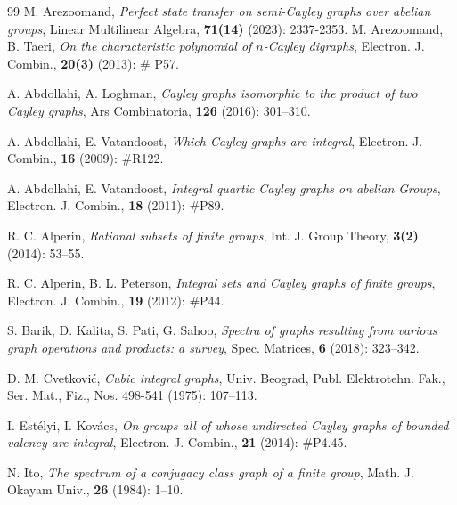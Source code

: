 \documentclass[12pt,a4paper]{article}
\newcommand{\rnote}[1]{{\color{red}{\sf #1}}}
\begin{document}
	
	\begin{thebibliography}{99}
		 M. Arezoomand, {\it Perfect state transfer on semi-Cayley graphs over abelian groups}, Linear Multilinear Algebra, {\bf 71(14)} (2023): 2337-2353.
		 M. Arezoomand, B. Taeri, {\it On the characteristic polynomial of $n$-Cayley digraphs}, Electron. J. Combin., {\bf 20(3)} (2013): \# P57.
		
		A. Abdollahi, A. Loghman, {\it Cayley graphs isomorphic to the product of two Cayley graphs},  Ars Combinatoria, {\bf 126} (2016): 301--310.
		
		
		A. Abdollahi, E. Vatandoost, {\it Which Cayley graphs are integral}, Electron. J. Combin., {\bf 16} (2009): \#R122.
		
		 A. Abdollahi, E. Vatandoost, {\it Integral quartic Cayley graphs on abelian Groups}, Electron. J. Combin., {\bf 18} (2011): \#P89.
		
		 R. C. Alperin, {\it Rational subsets of finite groups}, Int. J. Group Theory, {\bf 3(2)} (2014): 53--55.
		
		R. C. Alperin, B. L. Peterson, {\it Integral sets and Cayley graphs of finite groups},	Electron. J. Combin., {\bf 19} (2012): \#P44.
		
		S. Barik, D. Kalita, S. Pati, G. Sahoo, {\it Spectra of graphs resulting from various graph operations and products: a survey}, Spec. Matrices, {\bf 6} (2018): 323--342.
		
		
		 D. M. Cvetkovi\'{c}, {\it Cubic integral graphs}, Univ. Beograd, Publ. Elektrotehn. Fak., Ser. Mat., Fiz., Nos. 498-541 (1975): 107--113.
		
		
			I. Est\'{e}lyi, I. Kov\'{a}cs, {\it On groups all of whose undirected Cayley graphs of bounded valency are integral}, Electron. J. Combin., {\bf 21} (2014): \#P4.45.
		
		
		 N. Ito, {\it The spectrum of a conjugacy class graph of a finite group}, Math. J. Okayam Univ., {\bf 26} (1984): 1--10.
		

\end{thebibliography}
\end{document}
